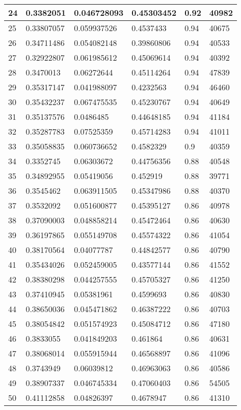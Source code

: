 \begin{longtable}{|l|l|l|l|l|l|}
24 & 0.3382051 & 0.046728093 & 0.45303452 & 0.92 & 40982 \\ \hline 
25 & 0.33807057 & 0.059937526 & 0.4537433 & 0.94 & 40675 \\ \hline 
26 & 0.34711486 & 0.054082148 & 0.39860806 & 0.94 & 40533 \\ \hline 
27 & 0.32922807 & 0.061985612 & 0.45069614 & 0.94 & 40392 \\ \hline 
28 & 0.3470013 & 0.06272644 & 0.45114264 & 0.94 & 47839 \\ \hline 
29 & 0.35317147 & 0.041988097 & 0.4232563 & 0.94 & 46460 \\ \hline 
30 & 0.35432237 & 0.067475535 & 0.45230767 & 0.94 & 40649 \\ \hline 
31 & 0.35137576 & 0.0486485 & 0.44648185 & 0.94 & 41184 \\ \hline 
32 & 0.35287783 & 0.07525359 & 0.45714283 & 0.94 & 41011 \\ \hline 
33 & 0.35058835 & 0.060736652 & 0.4582329 & 0.9 & 40359 \\ \hline 
34 & 0.3352745 & 0.06303672 & 0.44756356 & 0.88 & 40548 \\ \hline 
35 & 0.34892955 & 0.05419056 & 0.452919 & 0.88 & 39771 \\ \hline 
36 & 0.3545462 & 0.063911505 & 0.45347986 & 0.88 & 40370 \\ \hline 
37 & 0.3532092 & 0.051600877 & 0.45395127 & 0.86 & 40978 \\ \hline 
38 & 0.37090003 & 0.048858214 & 0.45472464 & 0.86 & 40630 \\ \hline 
39 & 0.36197865 & 0.055149708 & 0.45574322 & 0.86 & 41054 \\ \hline 
40 & 0.38170564 & 0.04077787 & 0.44842577 & 0.86 & 40790 \\ \hline 
41 & 0.35434026 & 0.052459005 & 0.43577144 & 0.86 & 41552 \\ \hline 
42 & 0.38380298 & 0.044257555 & 0.45705327 & 0.86 & 41250 \\ \hline 
43 & 0.37410945 & 0.05381961 & 0.4599693 & 0.86 & 40830 \\ \hline 
44 & 0.38650036 & 0.045471862 & 0.46387222 & 0.86 & 40703 \\ \hline 
45 & 0.38054842 & 0.051574923 & 0.45084712 & 0.86 & 47180 \\ \hline 
46 & 0.3833055 & 0.041849203 & 0.461864 & 0.86 & 40631 \\ \hline 
47 & 0.38068014 & 0.055915944 & 0.46568897 & 0.86 & 41096 \\ \hline 
48 & 0.3743949 & 0.06039812 & 0.46963063 & 0.86 & 40586 \\ \hline 
49 & 0.38907337 & 0.046745334 & 0.47060403 & 0.86 & 54505 \\ \hline 
50 & 0.41112858 & 0.04826397 & 0.4678947 & 0.86 & 41310 \\ \hline 
\end{longtable}